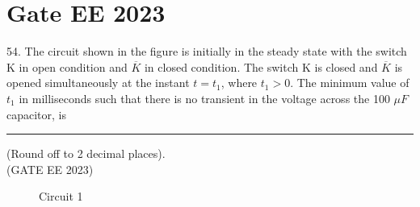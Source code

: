 \documentclass[journal,12pt,twocolumn]{IEEEtran}
\begin{document}


\vspace{3cm}

\title{}
\author{EE23BTECH11054 -  Sai Krishna Shanigarapu$^{*}$
}
\maketitle
\newpage
\bigskip


\section*{Gate EE 2023}
54. \hspace{2pt}The circuit shown in the figure is initially in the steady state with the switch K in open condition and $\overline{K}$ in closed condition. The switch K is closed and $\overline{K}$ is opened simultaneously at the instant $t = t_1$, where $t_1 > 0$. The minimum value of $t_1$ in milliseconds such that there is no transient in the voltage across the 100 $\mu F$ capacitor, is \rule{1cm}{0.15mm} (Round off to 2 decimal places).\\ 
\hfill(GATE EE 2023)

\begin{figure}[ht]
  \centering
  \begin{adjustbox}{width=\columnwidth}
      
  \end{adjustbox}
  \caption{Circuit 1}
\end{figure}
\end{document}
